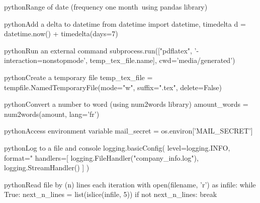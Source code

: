 \documentclass[10pt,a4paper]{article}
\begin{document}
\begin{multicols}{3}
\begin{codebox}{python}{Range of date (frequency one month\, using pandas library)}
\end{codebox}

\begin{codebox}{python}{Add a delta to datetime}
from datetime import datetime, timedelta
d = datetime.now() + timedelta(days=7)

\end{codebox}

\begin{codebox}{python}{Run an external command}
subprocess.run(["pdflatex", '-interaction=nonstopmode', temp_tex_file.name],
                       cwd='media/generated')

\end{codebox}

\begin{codebox}{python}{Create a temporary file}
temp_tex_file = tempfile.NamedTemporaryFile(mode="w", suffix=".tex", delete=False)

\end{codebox}

\begin{codebox}{python}{Convert a number to word (using num2words library)}
amount_words = num2words(amount, lang='fr')

\end{codebox}

\begin{codebox}{python}{Access environment variable}
mail_secret = os.environ['MAIL_SECRET']

\end{codebox}

\begin{codebox}{python}{Log to a file and console}
logging.basicConfig(
    level=logging.INFO,
    format="%
    handlers=[
        logging.FileHandler("company_info.log"),
        logging.StreamHandler()
    ]
)

\end{codebox}

\begin{codebox}{python}{Read file by (n) lines each iteration}
  with open(filename, 'r') as infile:
    while True:
      next_n_lines = list(islice(infile, 5))
      if not next_n_lines:
          break

\end{codebox}


\AtNextBibliography{\footnotesize}
\printbibliography  
\end{multicols}
\end{document}
